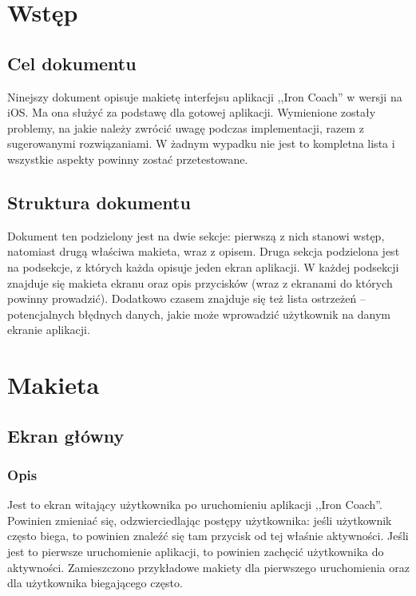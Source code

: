 

\setcounter{tocdepth}{2}
\tableofcontents
\clearpage
\section{Wstęp}
\subsection{Cel dokumentu}
\noindent Ninejszy dokument opisuje makietę interfejsu aplikacji ,,Iron Coach'' w wersji na iOS. Ma ona służyć za podstawę dla gotowej aplikacji. Wymienione zostały problemy, na jakie należy zwrócić uwagę podczas implementacji, razem z sugerowanymi rozwiązaniami. W żadnym wypadku nie jest to kompletna lista i wszystkie aspekty powinny zostać przetestowane.
\subsection{Struktura dokumentu}
\noindent Dokument ten podzielony jest na dwie sekcje: pierwszą z nich stanowi wstęp, natomiast drugą właściwa makieta, wraz z opisem. Druga sekcja podzielona jest na podsekcje, z których każda opisuje jeden ekran aplikacji. W każdej podsekcji znajduje się makieta ekranu oraz opis przycisków (wraz z ekranami do których powinny prowadzić). Dodatkowo czasem znajduje się też lista ostrzeżeń -- potencjalnych błędnych danych, jakie może wprowadzić użytkownik na danym ekranie aplikacji.
\section{Makieta}
\subsection{Ekran główny}
\subsubsection{Opis}
\noindent Jest to ekran witający użytkownika po uruchomieniu aplikacji ,,Iron Coach''. Powinien zmieniać się, odzwierciedlając postępy użytkownika: jeśli użytkownik często biega, to powinien znaleźć się tam przycisk od tej właśnie aktywności. Jeśli jest to pierwsze uruchomienie aplikacji, to powinien zachęcić użytkownika do aktywności. Zamieszczono przykładowe makiety dla pierwszego uruchomienia oraz dla użytkownika biegającego często.
